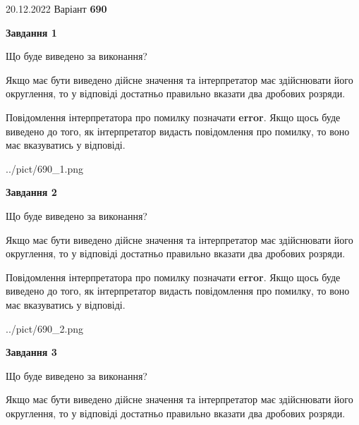 \documentclass[12pt, ukrainian]{article}
\begin{document}
{20.12.2022 Варіант \No \textbf { 690 }\par}
{
\begin {Large}

{\begin {center}\textbf{Завдання 1}\end {center}}\par
Що буде виведено за виконання? \par

Якщо має бути виведено дійсне значення та інтерпретатор має здійснювати його округлення, 
то у відповіді достатньо правильно вказати два дробових розряди.

Повідомлення інтерпретатора про помилку позначати \textbf{error}.
Якщо щось буде виведено до того, як інтерпретатор видасть повідомлення про помилку, 
то воно має вказуватись у відповіді. \par

\begin{center}
	{../pict/690_1.png}
\end{center}
\newpage

{\begin {center}\textbf{Завдання 2}\end {center}}\par
Що буде виведено за виконання? \par

Якщо має бути виведено дійсне значення та інтерпретатор має здійснювати його округлення, 
то у відповіді достатньо правильно вказати два дробових розряди.

Повідомлення інтерпретатора про помилку позначати \textbf{error}.
Якщо щось буде виведено до того, як інтерпретатор видасть повідомлення про помилку, 
то воно має вказуватись у відповіді. \par

\begin{center}
	{../pict/690_2.png}
\end{center}
\newpage

{\begin {center}\textbf{Завдання 3}\end {center}}\par
Що буде виведено за виконання? \par

Якщо має бути виведено дійсне значення та інтерпретатор має здійснювати його округлення, 
то у відповіді достатньо правильно вказати два дробових розряди.


\end{Large}}
\end{document}

